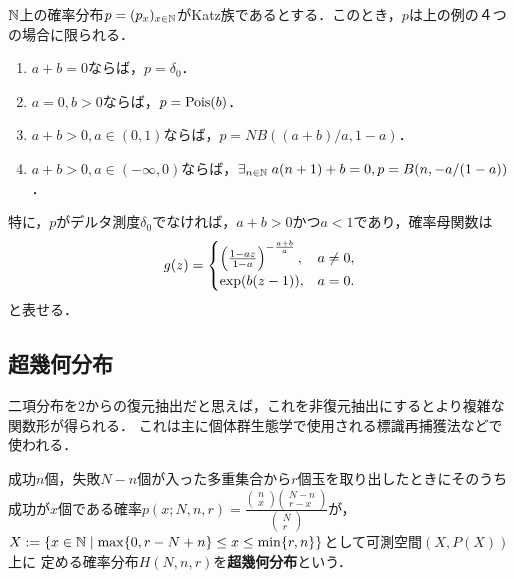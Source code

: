 \documentclass[uplatex,dvipdfmx]{jsreport}
\begin{document}
\begin{proposition}[実際の母数はかなり狭い]
    $\mathbb{N}$上の確率分布$p=(p_x)_{x\in\mathbb{N}}$がKatz族であるとする．このとき，$p$は上の例の４つの場合に限られる．
    \begin{enumerate}
        \item $a+b=0$ならば，$p=\delta_0$．
        \item $a=0,b>0$ならば，$p=\mathrm{Pois}(b)$．
        \item $a+b>0,a\in(0,1)$ならば，$p=NB((a+b)/a,1-a)$．
        \item $a+b>0,a\in(-\infty,0)$ならば，$\exists_{n\in\mathbb{N}}\;a(n+1)+b=0,p=B(n,-a/(1-a))$．
    \end{enumerate}
    特に，$p$がデルタ測度$\delta_0$でなければ，$a+b>0$かつ$a<1$であり，確率母関数は
    \[g(z)=\begin{cases}
        \left(\frac{1-az}{1-a}\right)^{-\frac{a+b}{a}},&a\ne 0,\\
        \exp(b(z-1)),&a=0.
    \end{cases}\]
    と表せる．
\end{proposition}

\subsection{超幾何分布}

\begin{tcolorbox}[colframe=ForestGreen, colback=ForestGreen!10!white,breakable,colbacktitle=ForestGreen!40!white,coltitle=black,fonttitle=\bfseries\sffamily,
title=]
    二項分布を$2$からの復元抽出だと思えば，これを非復元抽出にするとより複雑な関数形が得られる．
    これは主に個体群生態学で使用される標識再捕獲法などで使われる．
\end{tcolorbox}

\begin{definition}
    成功$n$個，失敗$N-n$個が入った多重集合から$r$個玉を取り出したときにそのうち成功が$x$個である確率$p(x;N,n,r)=\frac{\begin{pmatrix}n\\x\end{pmatrix}\begin{pmatrix}N-n\\r-x\end{pmatrix}}{\begin{pmatrix}N\\r\end{pmatrix}}$が，
    $X:=\left\{x\in\mathbb{N}\mid\max\{0,r-N+n\}\le x\le\min\{r,n\}\right\}$として可測空間$(X,P(X))$上に
    定める確率分布$H(N,n,r)$を\textbf{超幾何分布}という．
\end{definition}
\end{document}
